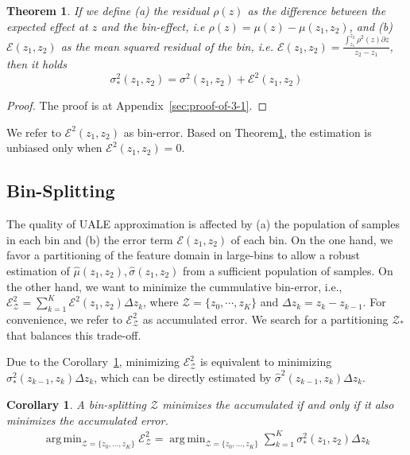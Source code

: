 \documentclass[twoside]{article}
\DeclareMathOperator*{\argmin}{arg\,min}
\newtheorem{theorem}{Theorem}[section]
\newtheorem{corollary}{Corollary}[theorem]
\begin{document}
\begin{theorem}
  \label{sec:theorem-1}
  If we define (a) the residual \(\rho(z)\) as the difference between
  the expected effect at \(z\) and the bin-effect, i.e
  \(\rho(z) = \mu(z) - \mu(z_1, z_2)\), and (b)
  \(\mathcal{E}(z_1, z_2)\) as the mean squared residual of the bin,
  i.e.
  \(\mathcal{E}(z_1, z_2) = \frac{\int_{z_1}^{z_2}\rho^2(z) \partial
    z}{z_2 - z_1}\), then it holds
\begin{equation}
    \label{eq:bin-uncertainty-proof}
 \sigma_*^2(z_1, z_2) = \sigma^2(z_1, z_2) + \mathcal{E}^2(z_1, z_2)
\end{equation}
  \end{theorem}

\begin{proof}
The proof is at Appendix~\ref{sec:proof-of-3-1}.
\end{proof}

\noindent

We refer to \(\mathcal{E}^2(z_1, z_2)\) as bin-error. Based on
Theorem\ref{sec:theorem-1}, the estimation is unbiased only when
\(\mathcal{E}^2(z_1, z_2) = 0\).

\subsection{Bin-Splitting}
\label{sec:bin-spliting}

The quality of UALE approximation is affected by (a) the population of
samples in each bin and (b) the error term \(\mathcal{E}(z_1, z_2)\)
of each bin. On the one hand, we favor a partitioning of the feature
domain in large-bins to allow a robust estimation of
\(\hat{\mu}(z_1, z_2), \hat{\sigma}(z_1, z_2)\) from a sufficient
population of samples. On the other hand, we want to minimize the
cummulative bin-error, i.e.,
\( \mathcal{E}^2_{\mathcal{Z}} = \sum_{k=1}^K\mathcal{E}^2(z_1, z_2)
\Delta z_k\), where \(\mathcal{Z} = \{z_0, \cdots, z_K\}\) and
\(\Delta z_k = z_k - z_{k-1}\). For convenience, we refer to
\(\mathcal{E}^2_{\mathcal{Z}}\) as accumulated error. We search for a
partitioning \(\mathcal{Z}_*\) that balances this trade-off.

Due to the Corollary~\ref{sec:coroll}, minimizing
\( \mathcal{E}^2_{\mathcal{Z}} \) is equivalent to minimizing
\(\sigma_*^2(z_{k-1}, z_k)\Delta z_k\), which can be directly
estimated by \(\hat{\sigma}^2(z_{k-1}, z_k) \Delta z_k \).

\begin{corollary}
  \label{sec:coroll}
  A bin-splitting \(\mathcal{Z}\) minimizes the accumulated if and
  only if it also minimizes the accumulated error.
  \begin{equation}
  \begin{gathered}
    \label{eq:2}
    \argmin_{ \mathcal{Z} = \{z_0, \ldots, z_K\}} \mathcal{E}^2_{\mathcal{Z}}  = \argmin_{ \mathcal{Z} = \{z_0, \ldots, z_K\}} \sum_{k=1}^K\sigma_*^2(z_1, z_2) \Delta z_k 
  \end{gathered}
  \end{equation}
\end{corollary}
\end{document}
